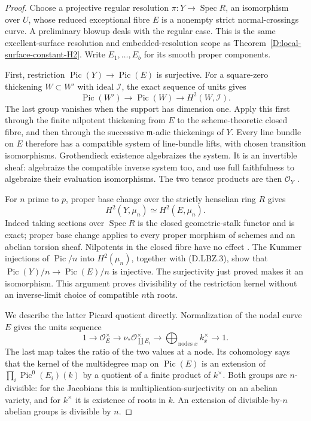 \begin{proof}
Choose a projective regular resolution
$\pi:Y\to\operatorname{Spec}R$, an isomorphism over $U$,
whose reduced exceptional fibre $E$ is a nonempty strict
normal-crossings curve.  A preliminary blowup deals with the
regular case.  This is the same excellent-surface resolution
and embedded-resolution scope as
Theorem~\ref{D:local-surface-constant-H2}.
Write $E_1,\ldots,E_b$ for its smooth proper components.

First, restriction $\operatorname{Pic}(Y)\to\operatorname{Pic}(E)$
is surjective.  For a square-zero thickening $W\subset W'$
with ideal $\mathcal I$, the exact sequence of units gives
\[
 \operatorname{Pic}(W')\longrightarrow\operatorname{Pic}(W)
                         \longrightarrow H^2(W,\mathcal I).
                                                        \tag{D.LBZ.2}
\]
The last group vanishes when the support has dimension one.
Apply this first through the finite nilpotent thickening
from $E$ to the scheme-theoretic closed fibre, and then
through the successive $\mathfrak m$-adic thickenings of $Y$.
Every line bundle on $E$ therefore has a compatible
system of line-bundle lifts, with chosen transition
isomorphisms.  Grothendieck existence algebraizes the system.
It is an invertible sheaf: algebraize the compatible inverse
system too, and use full faithfulness to algebraize their
evaluation isomorphisms.  The two tensor products are then
$\mathcal O_Y$
\citep[Lemma~37.4.1, Tag 0C6Q;
Theorem~30.27.1 and proof, Tag 088E]{StacksLocalBrauerZeroD}.

For $n$ prime to $p$, proper base change over the strictly
henselian ring $R$ gives
\[
                  H^2(Y,\mu_n)\simeq H^2(E,\mu_n).
                                                        \tag{D.LBZ.3}
\]
Indeed taking sections over $\operatorname{Spec}R$
is the closed geometric-stalk functor and is exact;
proper base change applies to every proper morphism of
schemes and an abelian torsion sheaf.  Nilpotents in
the closed fibre have no effect
\citep[Theorem~59.91.11 and complete proof,
Tag 095T]{StacksLocalBrauerZeroD}.
The Kummer injections of $\operatorname{Pic}/n$ into
$H^2(\mu_n)$, together with (D.LBZ.3), show that
$\operatorname{Pic}(Y)/n\to\operatorname{Pic}(E)/n$
is injective.  The surjectivity just proved makes it
an isomorphism.  This argument proves divisibility
of the restriction kernel without an inverse-limit
choice of compatible $n$th roots.

We describe the latter Picard quotient directly.
Normalization of the nodal curve $E$ gives the units
sequence
\[
 1\to\mathcal O_E^\times\to
   \nu_*\mathcal O_{\coprod E_i}^{\times}
       \to\bigoplus_{\text{nodes }x}k_x^\times\to1.
                                                        \tag{D.LBZ.4}
\]
The last map takes the ratio of the two values at a
node.  Its cohomology says that the kernel of the
multidegree map on $\operatorname{Pic}(E)$ is an
extension of $\prod_i\operatorname{Pic}^0(E_i)(k)$
by a quotient of a finite product of $k^\times$.
Both groups are $n$-divisible: for the Jacobians this
is multiplication-surjectivity on an abelian variety,
and for $k^\times$ it is existence of roots in $k$.
An extension of divisible-by-$n$ abelian groups is
divisible by $n$.


\end{proof}
